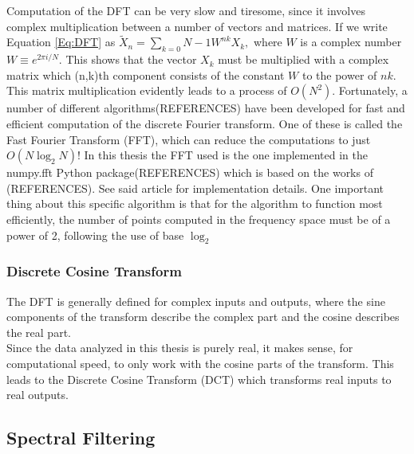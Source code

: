 \documentclass[../../CompleteThesis/Complete_1stDraft]{subfiles}
\begin{document}
Computation of the DFT can be very slow and tiresome, since it involves complex multiplication between a number of vectors and matrices. If we write Equation \ref{Eq:DFT} as $\tilde{X}_n = \sum_{k=0}{N-1}W^{nk}X_k,$ where  $W$ is a complex number $W\equiv e^{2\pi i /N}$. This shows that the vector $X_k$ must be multiplied with a complex matrix which (n,k)th component consists of the constant $W$ to the power of $nk$. This matrix multiplication evidently leads to a process of $O(N^2)$. Fortunately, a number of different algorithms(REFERENCES) have been developed for fast and efficient computation of the discrete Fourier transform. One of these is called the Fast Fourier Transform (FFT), which can reduce the computations to just $O(N\log_2 N)$! In this thesis the FFT used is the one implemented in the numpy.fft Python package(REFERENCES) which is based on the works of (REFERENCES). See said article for implementation details. One important thing about this specific algorithm is that for the algorithm to function most efficiently, the number of points computed in the frequency space must be of a power of 2, following the use of base $\log_2$
\subsubsection[DCT][DCT]{Discrete Cosine Transform}
The DFT is generally defined for complex inputs and outputs, where the sine components of the transform describe the complex part and the cosine describes the real part. \\
Since the data analyzed in this thesis is purely real, it makes sense, for computational speed, to only work with the cosine parts of the transform. This leads to the Discrete Cosine Transform (DCT) which transforms real inputs to real outputs.



\subsection[Spectral Filtering][Spectral Filtering]{Spectral Filtering}
\end{document}
